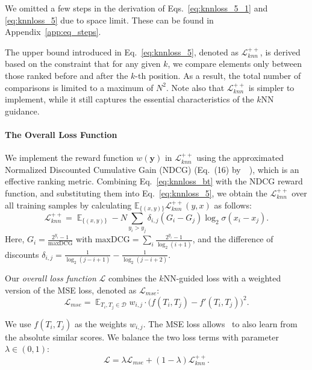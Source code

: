 We omitted a few steps in the derivation of Eqs.~\eqref{eq:knnloss_5_1} and \eqref{eq:knnloss_5} due to space limit. These can be found in Appendix~\ref{app:eq_steps}. 


The upper bound introduced in Eq.~\eqref{eq:knnloss_5}, denoted as $\mathcal{L}_{knn}^{++}$, is derived based on the constraint that for any given $k$,  we compare elements only between those ranked before and after the $k$-th position.  As a result, the total number of comparisons is limited to a maximum of $N^2$. Note also that $\mathcal{L}_{knn}^{++}$ is simpler to implement, while it still captures the essential characteristics of the $k$NN guidance.


\paragraph{The Overall Loss Function} We implement the reward function $w(\mathbf{y})$ in $\mathcal{L}_{knn}^{++}$ using the approximated Normalized Discounted Cumulative Gain (NDCG) (Eq.~(16) by~\citeauthor{lambdaloss}~\citeyear{lambdaloss}), which is an  effective ranking metric.  Combining Eq.~\eqref{eq:knnloss_bt} with the NDCG reward function, and substituting them into Eq.~\eqref{eq:knnloss_5}, we obtain 
the $\mathcal{L}_{knn}^{++}$ over all training samples by calculating $\mathbb{E}_{\{(x, y)\}}\mathcal{L}_{knn}^{++}(y, x)$ as follows:
{\small
\begin{equation}\label{eq:knnloss_6}
    \mathcal{L}_{knn}^{++}  =  \mathop{\mathbb{E}}_{\{(x, y)\}} -N\sum_{y_i > y_j} \delta_{i,j}(G_i - G_j) \log_{2} \sigma(x_i - x_j).
\end{equation}
}
Here, {\small$G_i = \frac{2^{y_i}-1}{\mathrm{maxDCG}}$} with  {\small$ \mathrm{maxDCG}=\sum_{i}\frac{2^{y_i}-1}{\log_2(i+1)}$}, and the difference of discounts {\small$ \delta_{i,j} = \frac{1}{\log_2(j-i+1)} - \frac{1}{\log_2(j-i+2)}$}.

Our \emph{overall loss function} $\mathcal{L}$ combines the $k$NN-guided loss with a weighted version of the MSE loss, denoted as $\mathcal{L}_{mse}$:
{\small
\begin{equation}\label{eq:mse_loss}
\mathcal{L}_{mse} = \displaystyle \mathop{\mathbb{E}}_{ T_i, T_j \in \mathcal{D}} w_{i,j} \cdot \big(f(T_i, T_j) - f'(T_i, T_j)\big)^2.
\end{equation}
}

We use $f(T_i, T_j)$ as the weights $w_{i,j}$. The MSE loss allows \model\ to also learn from the absolute similar scores.  We balance the two loss terms with  parameter $\lambda \in (0,1)$:
\begin{equation}\label{eq:loss}
    \mathcal{L} = \lambda\mathcal{L}_{mse} + (1-\lambda)\mathcal{L}_{knn}^{++}.
\end{equation}

